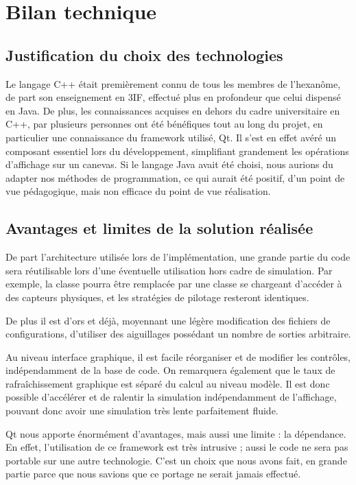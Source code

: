 \newcommand{\h}{\unit{h}}

\section{Bilan technique}
\subsection{Justification du choix des technologies}
Le langage C++ était premièrement connu de tous les membres de l'hexanôme, de part son enseignement en 3IF, effectué plus en profondeur que celui dispensé en Java.
De plus, les connaissances acquises en dehors du cadre universitaire en C++, par plusieurs personnes ont été bénéfiques tout au long du projet, en particulier une connaissance du framework utilisé, Qt. Il s'est en effet avéré un composant essentiel lors du développement, simplifiant grandement les opérations d'affichage sur un canevas. Si le langage Java avait été choisi, nous aurions du adapter nos méthodes de programmation, ce qui aurait été positif, d'un point de vue pédagogique, mais non efficace du point de vue réalisation.

\subsection{Avantages et limites de la solution réalisée}
De part l'architecture utilisée lors de l'implémentation, une grande partie du code sera réutilisable lors d'une éventuelle utilisation hors cadre de simulation. Par exemple, la classe  pourra être remplacée par une classe se chargeant d'accéder à des capteurs physiques, et les stratégies de pilotage resteront identiques.

De plus il est d'ors et déjà, moyennant une légère modification des fichiers de configurations, d'utiliser des aiguillages possédant un nombre de sorties arbitraire.

Au niveau interface graphique, il est facile réorganiser et de modifier les contrôles, indépendamment de la base de code.
On remarquera également que le taux de rafraîchissement graphique est séparé du calcul au niveau modèle. Il est donc possible d'accélérer et de ralentir la simulation indépendamment de l'affichage, pouvant donc avoir une simulation très lente parfaitement fluide.

Qt nous apporte énormément d'avantages, mais aussi une limite : la dépendance. En effet, l'utilisation de ce framework est très intrusive ; aussi le code ne sera pas portable sur une autre technologie. C'est un choix que nous avons fait, en grande partie parce que nous savions que ce portage ne serait jamais effectué.

